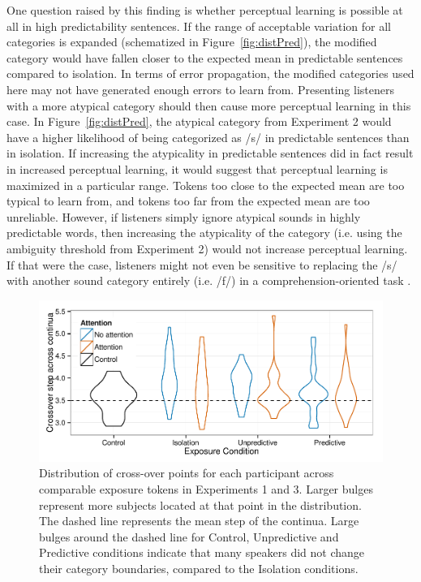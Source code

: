 One question raised by this finding is whether perceptual learning is possible at all in high predictability sentences.
If the range of acceptable variation for all categories is expanded (schematized in Figure~\ref{fig:distPred}), the modified category would have fallen closer to the expected mean in predictable sentences compared to isolation.
In terms of error propagation, the modified categories used here may not have generated enough errors to learn from.
Presenting listeners with a more atypical category should then cause more perceptual learning in this case.
In Figure~\ref{fig:distPred}, the atypical category from Experiment 2 would have a higher likelihood of being categorized as /s/ in predictable sentences than in isolation.
If increasing the atypicality in predictable sentences did in fact result in increased perceptual learning, it would suggest that perceptual learning is maximized in a particular range.
Tokens too close to the expected mean are too typical to learn from, and tokens too far from the expected mean are too unreliable.
However, if listeners simply ignore atypical sounds in highly predictable words, then increasing the atypicality of the category (i.e. using the ambiguity threshold from Experiment 2) would not increase perceptual learning.
If that were the case, listeners might not even be sensitive to replacing the /s/ with another sound category entirely (i.e. /f/) in a comprehension-oriented task \citep[but see][]{Samuel1981}.


\begin{figure}[!ht]
\centering
\caption{Distribution of cross-over points for each participant across comparable exposure tokens in Experiments 1 and 3.  Larger bulges represent more subjects located at that point in the distribution.  The dashed line represents the mean step of the continua.  Large bulges around the dashed line for Control, Unpredictive and Predictive conditions indicate that many speakers did not change their category boundaries, compared to the Isolation conditions.}
\label{fig:exp13xoverdist}
\begin{center}
\includegraphics[width=\textwidth]{graphs/exp13_xoverdist}
\end{center}
\end{figure}

